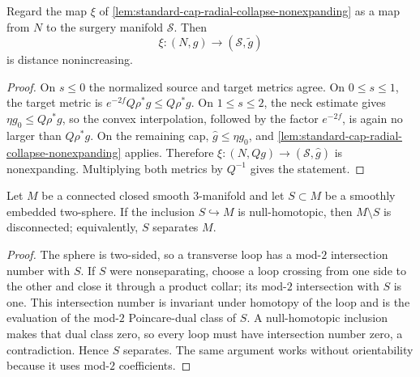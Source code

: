 \begin{lemma}
\label{lem:radial-surgery-map-nonexpanding}
\notready
Regard the map $\xi$ of
\ref{lem:standard-cap-radial-collapse-nonexpanding} as a map from $N$
to the surgery manifold $\mathcal S$.  Then
\[
 \xi\colon(N,g)\longrightarrow(\mathcal S,\widetilde g)
\]
is distance nonincreasing.
\end{lemma}

\begin{proof}
On $s\le0$ the normalized source and target metrics agree.  On
$0\le s\le1$, the target metric is $e^{-2f}Q\rho^*g\le Q\rho^*g$.
On $1\le s\le2$, the neck estimate gives
$\eta g_0\le Q\rho^*g$, so the convex interpolation, followed by the
factor $e^{-2f}$, is again no larger than $Q\rho^*g$.  On the remaining
cap, $\widehat g\le\eta g_0$, and
\ref{lem:standard-cap-radial-collapse-nonexpanding} applies.  Therefore
$\xi\colon(N,Qg)\to(\mathcal S,\widehat g)$ is nonexpanding.  Multiplying
both metrics by $Q^{-1}$ gives the statement.
\end{proof}

\begin{lemma}
\label{lem:nullhomotopic-embedded-sphere-separates}
\notready
Let $M$ be a connected closed smooth $3$-manifold and let
$S\subset M$ be a smoothly embedded two-sphere.  If the inclusion
$S\hookrightarrow M$ is null-homotopic, then $M\setminus S$ is disconnected;
equivalently, $S$ separates $M$.
\end{lemma}

\begin{proof}
The sphere is two-sided, so a transverse loop has a mod-$2$ intersection number
with $S$.  If $S$ were nonseparating, choose a loop crossing from one side to
the other and close it through a product collar; its mod-$2$ intersection with
$S$ is one.  This intersection number is invariant under homotopy of the
loop and is the evaluation of the mod-$2$ Poincare-dual class of $S$.  A
null-homotopic inclusion makes that dual class zero, so every loop must have
intersection number zero, a contradiction.  Hence $S$ separates.  The same
argument works without orientability because it uses mod-$2$ coefficients.
\end{proof}

